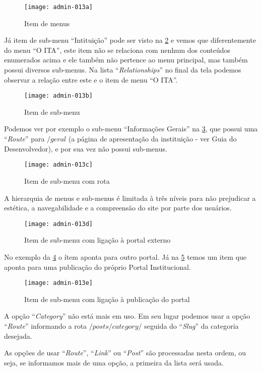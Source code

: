 \begin{figure}[!ht]
    \centering
    \texttt{[image: admin-013a]}
    \caption{Item de menus}\label{RS0006:fig:admin-013a}
\end{figure}

Já item de sub-menu ``Intituição'' pode ser visto na \cref{RS0006:fig:admin-013b} e vemos que diferentemente do menu ``O ITA'', este item não se relaciona com nenhum dos conteúdos enumerados acima e ele também não pertence ao menu principal, mas também possui diversos sub-menus. Na lista ``\textit{Relationships}'' no final da tela podemos observar a relação entre este e o item de menu ``O ITA''.

\begin{figure}[!ht]
    \centering
    \texttt{[image: admin-013b]}
    \caption{Item de sub-menu}\label{RS0006:fig:admin-013b}
\end{figure}

Podemos ver por exemplo o sub-menu ``Informações Gerais'' na \cref{RS0006:fig:admin-013c}, que possui uma ``\textit{Route}'' para $/geral$ (a página de apresentação da instituição - ver Guia do Desenvolvedor), e por sua vez não possui sub-menus.

\begin{figure}[!ht]
    \centering
    \texttt{[image: admin-013c]}
    \caption{Item de sub-menu com rota}\label{RS0006:fig:admin-013c}
\end{figure}

\begin{displayquote}
    A hierarquia de menus e sub-menus é limitada à três níveis para não prejudicar a estética, a navegabilidade e a compreensão do site por parte dos usuários.
\end{displayquote}

\begin{figure}[!ht]
    \centering
    \texttt{[image: admin-013d]}
    \caption{Item de sub-menu com ligação à portal externo}\label{RS0006:fig:admin-013d}
\end{figure}

No exemplo da \cref{RS0006:fig:admin-013d} o ítem aponta para outro portal. Já na \cref{RS0006:fig:admin-013e} temos um item que aponta para uma publicação do próprio Portal Institucional.

\begin{figure}[!ht]
    \centering
    \texttt{[image: admin-013e]}
    \caption{Item de sub-menu com ligação à publicação do portal}\label{RS0006:fig:admin-013e}
\end{figure}

\begin{displayquote}
    A opção ``\textit{Category}'' não está mais em uso. Em seu lugar podemos usar a opção ``\textit{Route}'' informando a rota $/posts/category/$ seguida do ``\textit{Slug}'' da categoria desejada.
\end{displayquote}

\begin{displayquote}
    As opções de usar ``\textit{Route}'', ``\textit{Link}'' ou ``\textit{Post}'' são processadas nesta ordem, ou seja, se informamos mais de uma opção, a primeira da lista será usada.
\end{displayquote}